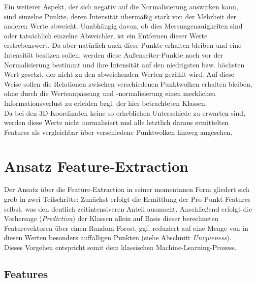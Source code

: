 Ein weiterer Aspekt, der sich negativ auf die Normalisierung auswirken kann, sind einzelne Punkte, deren Intensität übermäßig stark von der Mehrheit der anderen Werte abweicht. Unabhängig davon, ob dies Messungenauigkeiten sind oder tatsächlich einzelne Abweichler, ist ein Entfernen dieser Werte erstrebenswert. Da aber natürlich auch diese Punkte erhalten bleiben und eine Intensität besitzen sollen, werden diese Außenseiter-Punkte noch vor der Normalisierung bestimmt und ihre Intensität auf den niedrigsten bzw. höchsten Wert gesetzt, der nicht zu den abweichenden Werten gezählt wird. Auf diese Weise sollen die Relationen zwischen verschiedenen Punktwolken erhalten bleiben, ohne durch die Werteanpassung und -normalisierung einen merklichen Informationsverlust zu erleiden bzgl. der hier betrachteten Klassen. \\
Da bei den 3D-Koordinaten keine so erheblichen Unterschiede zu erwarten sind, werden diese Werte nicht normalisiert und alle letztlich daraus ermittelten Features als vergleichbar über verschiedene Punktwolken hinweg angesehen.

\section{Ansatz Feature-Extraction}

Der Ansatz über die Feature-Extraction in seiner momentanen Form gliedert sich grob in zwei Teilschritte: Zunächst erfolgt die Ermittlung der Pro-Punkt-Features selbst, was den deutlich zeitintensiveren Anteil ausmacht. Anschließend erfolgt die Vorhersage (\textit{Prediction}) der Klassen allein auf Basis dieser berechneten Featurevektoren über einen Random Forest, ggf. reduziert auf eine Menge von in diesen Werten besonders auffälligen Punkten (siehe Abschnitt \textit{Uniqueness}). Dieses Vorgehen entspricht somit dem klassischen Machine-Learning-Prozess.

\subsection{Features}

